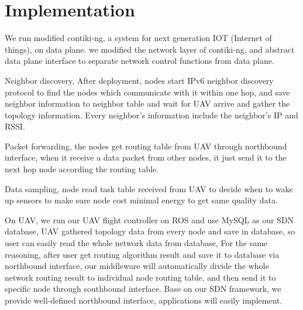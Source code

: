 \section{Implementation}
\label{Imp}

We run modified contiki-ng, a system for next generation IOT (Internet of things), on data plane. we modified the network layer of contiki-ng, and abstract data plane interface to separate network control functions from data plane. 

Neighbor discovery, After deployment, nodes start IPv6 neighbor discovery protocol to find the nodes which communicate with it within one hop, and save neighbor information to neighbor table and wait for UAV arrive 
and gather the topology information. Every neighbor's information include the neighbor's IP and RSSI. 

Packet forwarding, the nodes get routing table from UAV through northbound interface, when it receive a data packet from other nodes, it just send it to the next hop node according the routing table.

Data sampling, node read task table received from UAV to decide when to wake up sensors to make sure node cost minimal energy to get same quality data. 

On UAV, we run our UAV flight controller on ROS and use MySQL as our SDN database, UAV gathered topology data from every node and save in database, 
so user can easily read the whole network data from database, For the same 
reasoning, after user get routing algorithm result and save it to database via northbound interface, 
our middleware will automatically divide the whole network routing result to individual node routing table, and then send it to specific node
through southbound interface. Base on our SDN framework, we provide well-defined northbound interface, applications will easily implement.